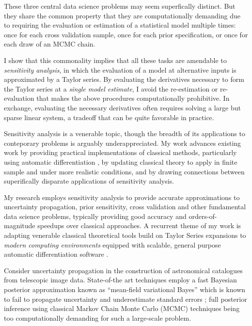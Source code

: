 These three central data science problems may seem superfically distinct.  But
they share the common property that they are computationally demanding due to
requiring the evaluation or estimation of a statistical model multiple times:
once for each cross validation sample, once for each prior specification, or
once for each draw of an MCMC chain.

I show that this commonality implies that all these tasks are amendable to {\em
sensitivity analysis}, in which the evaluation of a model at alternative inputs
is approximated by a Taylor series.  By evaluating the derivatives necessary to
form the Taylor series at a {\em single model estimate}, I avoid the
re-estimation or re-evaluation that makes the above procedures computationally
prohibitive.  In exchange, evaluating the necessary derivatives often requires
solving a large but sparse linear system, a tradeoff that can be quite favorable
in practice.

Sensitivity analysis is a venerable topic, though the breadth of its
applications to conteporary problems is arguably underappreciated.  My work
advances existing work by providing practical implementations of classical
methods, particularly using automatic differentiation
\citep{baydin:2015:automatic}, by updating classical theory to apply in finite
sample and under more realistic conditions, and by drawing connections between
superifically disparate applications of sensitivity analysis.




\newpage

My research employs sensitivity analysis to provide accurate approximations to
uncertainty propagation, prior sensitivity, cross validation and other
fundamental data science problems, typically providing good accuracy and
orders-of-magnitude speedups over classical approaches.  A recurrent theme of my
work is adapting venerable classical theoretical tools build on Taylor Series
expansions  \citep{reeds:1976:thesis, gustafson:1996:localposterior,
opper:2001:advancedmeanfield} to {\em modern computing environments} equipped
with scalable, general purpose automatic differentiation software
\citep{baydin:2015:automatic, carpenter:2015:stanmath}.




Consider uncertainty propagation in the construction of astronomical catalogues
from telescopic image data. State-of-the art techniques employ a fast Bayesian
posterior approximation known as ``mean-field variational Bayes''
\citep{regier:2019:cataloging} which is known to fail to propagate uncertainty
and underestimate standard errors \citep{turner:2011:two}; full posterior
inference using classical Markov Chain Monte Carlo (MCMC) techniques being too
computationally demanding for such a large-scale problem.

